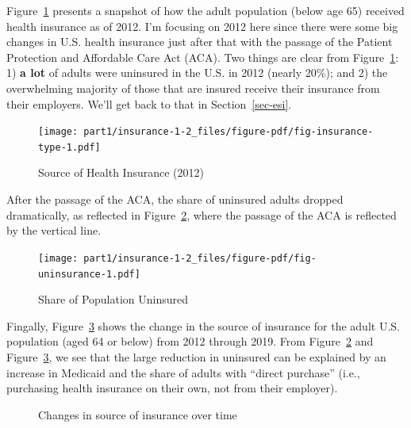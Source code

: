 \documentclass[
  letterpaper,
  DIV=11,
  numbers=noendperiod]{scrreport}
\theoremstyle{definition}
\theoremstyle{remark}
\begin{document}
Figure~\ref{fig-insurance-type} presents a snapshot of how the adult
population (below age 65) received health insurance as of 2012. I'm
focusing on 2012 here since there were some big changes in U.S. health
insurance just after that with the passage of the Patient Protection and
Affordable Care Act (ACA). Two things are clear from
Figure~\ref{fig-insurance-type}: 1) \textbf{a lot} of adults were
uninsured in the U.S. in 2012 (nearly 20\%); and 2) the overwhelming
majority of those that are insured receive their insurance from their
employers. We'll get back to that in Section~\ref{sec-esi}.

\begin{figure}

{\centering \texttt{[image: part1/insurance-1-2\_files/figure-pdf/fig-insurance-type-1.pdf]}

}

\caption{\label{fig-insurance-type}Source of Health Insurance (2012)}

\end{figure}

After the passage of the ACA, the share of uninsured adults dropped
dramatically, as reflected in Figure~\ref{fig-uninsurance}, where the
passage of the ACA is reflected by the vertical line.

\begin{figure}

{\centering \texttt{[image: part1/insurance-1-2\_files/figure-pdf/fig-uninsurance-1.pdf]}

}

\caption{\label{fig-uninsurance}Share of Population Uninsured}

\end{figure}

Fingally, Figure~\ref{fig-insurance-time} shows the change in the source
of insurance for the adult U.S. population (aged 64 or below) from 2012
through 2019. From Figure~\ref{fig-uninsurance} and
Figure~\ref{fig-insurance-time}, we see that the large reduction in
uninsured can be explained by an increase in Medicaid and the share of
adults with ``direct purchase'' (i.e., purchasing health insurance on
their own, not from their employer).

\begin{figure}

{\centering 

}

\caption{\label{fig-insurance-time}Changes in source of insurance over
time}

\end{figure}
\end{document}
